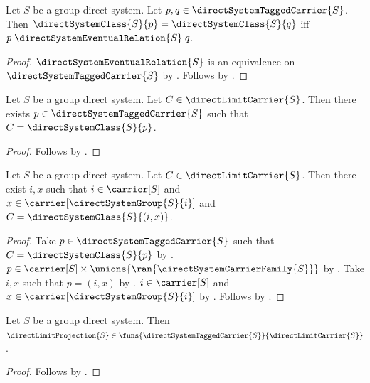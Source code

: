 \begin{proposition}\label{direct_system_class_equality_iff}
    Let $S$ be a group direct system.
    Let $p,q\in\directSystemTaggedCarrier{S}$.
    Then $\directSystemClass{S}{p}=\directSystemClass{S}{q}$ iff
        $p\mathrel{\directSystemEventualRelation{S}}q$.
\end{proposition}
\begin{proof}
    $\directSystemEventualRelation{S}$ is an equivalence on
        $\directSystemTaggedCarrier{S}$ by
        .
    Follows by
        .
\end{proof}

\begin{proposition}\label{direct_limit_carrier_representation}
    Let $S$ be a group direct system.
    Let $C\in\directLimitCarrier{S}$.
    Then there exists $p\in\directSystemTaggedCarrier{S}$ such that
        $C=\directSystemClass{S}{p}$.
\end{proposition}
\begin{proof}
    Follows by
        .
\end{proof}

\begin{proposition}\label{direct_limit_carrier_coordinates}
    Let $S$ be a group direct system.
    Let $C\in\directLimitCarrier{S}$.
    Then there exist $i,x$ such that $i\in\carrier[S]$ and
        $x\in\carrier[\directSystemGroup{S}{i}]$ and
        $C=\directSystemClass{S}{(i,x)}$.
\end{proposition}
\begin{proof}
    Take $p\in\directSystemTaggedCarrier{S}$ such that
        $C=\directSystemClass{S}{p}$ by
        .
    $p\in\carrier[S]\times\unions{\ran{\directSystemCarrierFamily{S}}}$ by
        .
    Take $i,x$ such that $p=(i,x)$ by
        .
    $i\in\carrier[S]$ and
        $x\in\carrier[\directSystemGroup{S}{i}]$ by
        .
    Follows by \auto.
\end{proof}

\begin{proposition}\label{direct_limit_projection_type}
    Let $S$ be a group direct system.
    Then $\directLimitProjection{S}\in
        \funs{\directSystemTaggedCarrier{S}}{\directLimitCarrier{S}}$.
\end{proposition}
\begin{proof}
    Follows by
        .
\end{proof}

